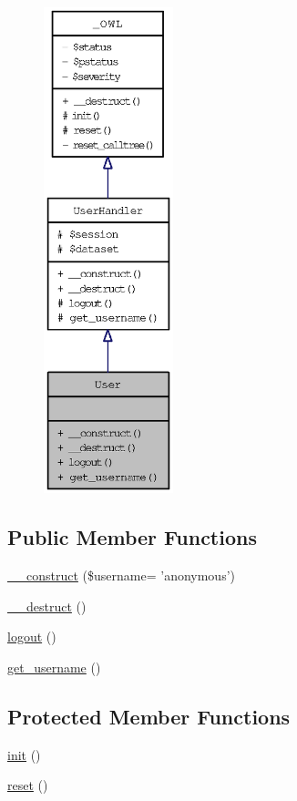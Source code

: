 \begin{figure}[H]
\begin{center}
\leavevmode
\includegraphics[height=400pt]{classUser__coll__graph}
\end{center}
\end{figure}
\subsection*{Public Member Functions}
\begin{CompactItemize}
\item 
\hyperlink{classUser_16b171e344993f5d4c3aa8cddcfc8050}{\_\-\_\-construct} (\$username= 'anonymous')
\item 
\hyperlink{classUser_ccd20149a7414612c1505e022eb63ffc}{\_\-\_\-destruct} ()
\item 
\hyperlink{classUser_06ed977c877b02b420233d4f18a6a668}{logout} ()
\item 
\hyperlink{classUser_1348ddf190d4df2518665fb51305a902}{get\_\-username} ()
\end{CompactItemize}
\subsection*{Protected Member Functions}
\begin{CompactItemize}
\item 
\hyperlink{class__OWL_e0ef3ded56e8a6b34b6461e5a721cd3e}{init} ()
\item 
\hyperlink{class__OWL_2f2a042bcf31965194c03033df0edc9b}{reset} ()
\end{CompactItemize}
